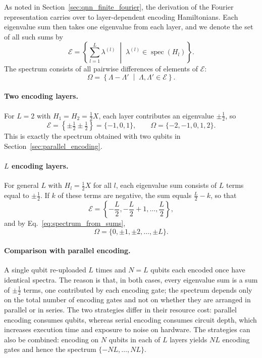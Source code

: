 \documentclass[12pt]{article}
\numberwithin{equation}{section}  %
\begin{document}
As noted in Section~\ref{sec:qnn_finite_fourier}, the derivation of the Fourier representation carries over to layer-dependent encoding Hamiltonians. Each eigenvalue sum then takes one eigenvalue from each layer, and we denote the set of all such sums by
\begin{equation}
\mathcal{E} = \left\{ \sum_{l=1}^{L} \lambda^{(l)} \;\middle|\; \lambda^{(l)} \in \operatorname{spec}(H_l) \right\}.
\end{equation}
The spectrum consists of all pairwise differences of elements of $\mathcal{E}$:
\begin{equation}
\Omega = \left\{ \Lambda - \Lambda' \;\middle|\; \Lambda, \Lambda' \in \mathcal{E} \right\}.
\label{eq:spectrum_from_sums}
\end{equation}

\paragraph{Two encoding layers.} For $L = 2$ with $H_1 = H_2 = \frac{1}{2}X$, each layer contributes an eigenvalue $\pm\frac{1}{2}$, so
\begin{equation}
\mathcal{E} = \left\{ \pm\tfrac{1}{2} \pm \tfrac{1}{2} \right\} = \{-1, 0, 1\},
\qquad
\Omega = \{-2, -1, 0, 1, 2\}.
\end{equation}
This is exactly the spectrum obtained with two qubits in Section~\ref{sec:parallel_encoding}.

\paragraph{$L$ encoding layers.} For general $L$ with $H_l = \frac{1}{2}X$ for all $l$, each eigenvalue sum consists of $L$ terms equal to $\pm\frac{1}{2}$. If $k$ of these terms are negative, the sum equals $\frac{L}{2} - k$, so that
\begin{equation}
\mathcal{E} = \left\{ -\frac{L}{2}, -\frac{L}{2}+1, \ldots, \frac{L}{2} \right\},
\end{equation}
and by Eq.~\eqref{eq:spectrum_from_sums},
\begin{equation}
\Omega = \{0, \pm1, \pm2, \ldots, \pm L\}.
\end{equation}

\paragraph{Comparison with parallel encoding.} A single qubit re-uploaded $L$ times and $N = L$ qubits each encoded once have identical spectra. The reason is that, in both cases, every eigenvalue sum is a sum of $\pm\frac{1}{2}$ terms, one contributed by each encoding gate; the spectrum depends only on the total number of encoding gates and not on whether they are arranged in parallel or in series. The two strategies differ in their resource cost: parallel encoding consumes qubits, whereas serial encoding consumes circuit depth, which increases execution time and exposure to noise on hardware. The strategies can also be combined: encoding on $N$ qubits in each of $L$ layers yields $NL$ encoding gates and hence the spectrum $\{-NL, \ldots, NL\}$.
\end{document}
